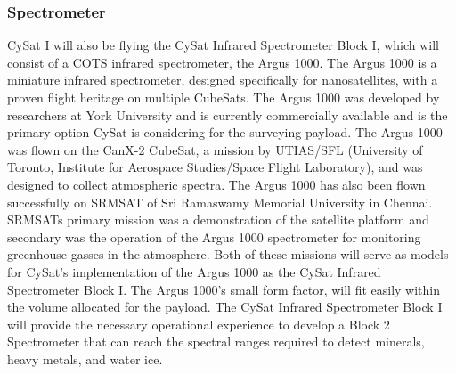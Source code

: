 \documentclass[nocover]            %
{CSLI}                       %
\begin{document}
\subsubsection{Spectrometer}
CySat I will also be flying the CySat Infrared Spectrometer Block I, which will consist of a COTS infrared spectrometer, the Argus 1000. The Argus 1000 is a miniature infrared spectrometer, designed specifically for nanosatellites, with a proven flight heritage on multiple CubeSats. The Argus 1000 was developed by researchers at York University and is currently commercially available and is the primary option CySat is considering for the surveying payload. The Argus 1000 was flown on the CanX-2 CubeSat, a mission by UTIAS/SFL (University of Toronto, Institute for Aerospace Studies/Space Flight Laboratory), and was designed to collect atmospheric spectra. The Argus 1000 has also been flown successfully on SRMSAT of Sri Ramaswamy Memorial University in Chennai. SRMSATs primary mission was a demonstration of the satellite platform and secondary was the operation of the Argus 1000 spectrometer for monitoring greenhouse gasses in the atmosphere. Both of these missions will serve as models for CySat's implementation of the Argus 1000 as the CySat Infrared Spectrometer Block I. The Argus 1000's small form factor, will fit easily within the volume allocated for the payload. The CySat Infrared Spectrometer Block I will provide the necessary operational experience to develop a Block 2 Spectrometer that can reach the spectral ranges required to detect minerals, heavy metals, and water ice.
\end{document}
